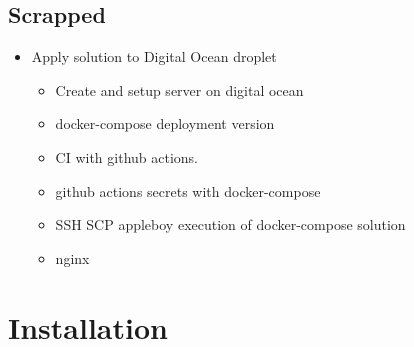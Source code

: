 \documentclass[a4paper, 12pt]{article}
\begin{document}
\subsection{Scrapped}
\begin{itemize}
	\item Apply solution to Digital Ocean droplet
	\begin{itemize}
		\item Create and setup server on digital ocean
		\item docker-compose deployment version
		\item CI with github actions.
		\item github actions secrets with docker-compose
		\item SSH SCP appleboy execution of docker-compose solution
		\item nginx
	\end{itemize}

\end{itemize}

\section{Installation}
\end{document}
